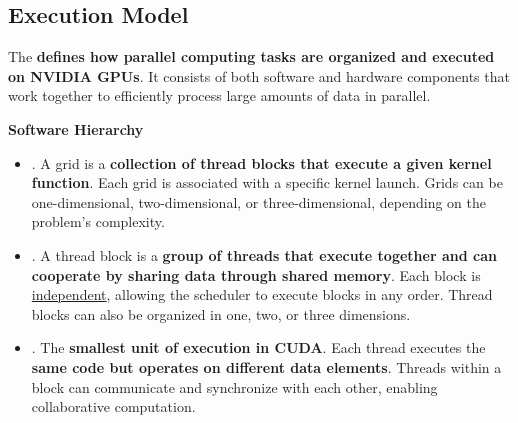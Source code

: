 \subsection{Execution Model}

The  \textbf{defines how parallel computing tasks are organized and executed on NVIDIA GPUs}. It consists of both software and hardware components that work together to efficiently process large amounts of data in parallel.

\begin{flushleft}
    \textcolor{Green3}{ \textbf{Software Hierarchy}}
\end{flushleft}
\begin{itemize}
    \item {}. A grid is a \textbf{collection of thread blocks that execute a given kernel function}. Each grid is associated with a specific kernel launch. Grids can be one-dimensional, two-dimensional, or three-dimensional, depending on the problem's complexity.

    \item {}. A thread block is a \textbf{group of threads that execute together and can cooperate by sharing data through shared memory}. Each block is \underline{independent}, allowing the scheduler to execute blocks in any order. Thread blocks can also be organized in one, two, or three dimensions.

    \item {}. The \textbf{smallest unit of execution in CUDA}. Each thread executes the \textbf{same code but operates on different data elements}. Threads within a block can communicate and synchronize with each other, enabling collaborative computation.
\end{itemize}

